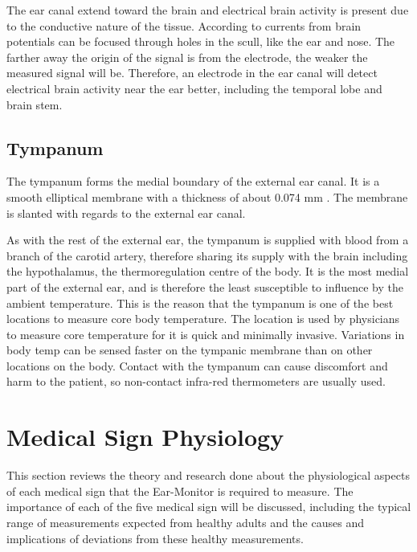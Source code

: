 \medskip

The ear canal extend toward the brain and electrical brain activity is present due to the conductive nature of the tissue. According to \cite{nunez2006electric} currents from brain potentials can be focused through holes in the scull, like the ear and nose. The farther away the origin of the signal is from the electrode, the weaker the measured signal will be. Therefore, an electrode in the ear canal will detect electrical brain activity near the ear better, including the temporal lobe and brain stem.

\subsection{Tympanum}
The tympanum forms the medial boundary of the external ear canal. It is a smooth elliptical membrane with a thickness of about 0.074 mm \citep{alvord1997anatomy}. The membrane is slanted with regards to the external ear canal.

\medskip

As with the rest of the external ear, the tympanum is supplied with blood from a branch of the carotid artery, therefore sharing its supply with the brain including the hypothalamus, the thermoregulation centre of the body. It is the most medial part of the external ear, and is therefore the least susceptible to influence by the ambient temperature. This is the reason that the tympanum is one of the best locations to measure core body temperature. The location is used by physicians to measure core temperature for it is quick and minimally invasive. Variations in body temp can be sensed faster on the tympanic membrane than on other locations on the body. Contact with the tympanum can cause discomfort and harm to the patient, so non-contact infra-red thermometers are usually used.


\section{Medical Sign Physiology} %
This section reviews the theory and research done about the physiological aspects of each medical sign that the Ear-Monitor is required to measure. The importance of each of the five medical sign will be discussed, including the typical range of measurements expected from healthy adults and the causes and implications of deviations from these healthy measurements.


